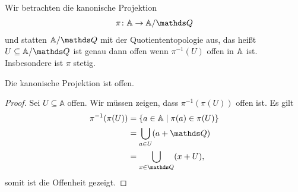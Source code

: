 Wir betrachten die kanonische Projektion
\begin{align*}
\pi \colon \A \to \A/\Q
\end{align*}
und statten $\A/\Q$ mit der Quotiententopologie aus, das heißt $U \subseteq \A/\Q$ ist genau dann offen wenn $\pi^{-1}(U)$ offen in $\mathbb{A}$ ist.
Insbesondere ist $\pi$ stetig.
\begin{prop}
Die kanonische Projektion ist offen.
\end{prop}
\begin{proof}
Sei $U\subseteq \mathbb{A}$ offen. Wir müssen zeigen, dass $\pi^{-1}(\pi(U))$ offen ist.
Es gilt
\begin{align*}
\pi^{-1}(\pi(U))&=\{a \in \mathbb{A} \mid \pi(a)\in \pi(U)\}\\
&=\bigcup_{a \in U} (a+\Q)\\
&=\bigcup_{x\in \Q} (x+U),
\end{align*}
somit ist die Offenheit gezeigt.
\end{proof}

